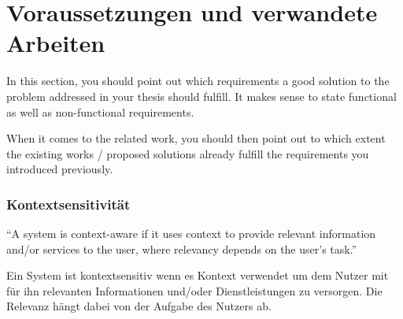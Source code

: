 \chapter{Voraussetzungen und verwandete Arbeiten}
\label{cha:requirements_and_related_work}

In this section, you should point out which requirements a good solution to the problem addressed in your thesis should fulfill.
It makes sense to state functional as well as non-functional requirements.

When it comes to the related work, you should then point out to which extent the existing works / proposed solutions already fulfill the requirements you introduced previously.


\subsection{Kontextsensitivität}
“A system is context-aware if it uses context to provide relevant information and/or services to the user, where relevancy depends on the user’s task.” 

Ein System ist kontextsensitiv wenn es Kontext verwendet um dem Nutzer mit für ihn relevanten Informationen und/oder Dienstleistungen zu versorgen. Die Relevanz hängt dabei von der Aufgabe des Nutzers ab.